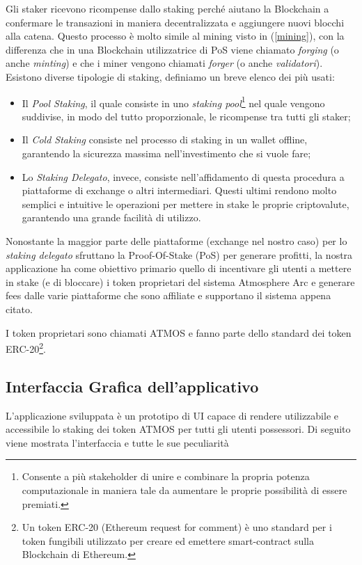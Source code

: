 Gli staker ricevono ricompense dallo staking perché aiutano la Blockchain a confermare le transazioni in maniera decentralizzata e aggiungere nuovi blocchi alla catena. Questo processo è molto simile al mining visto in (\ref{mining}), con la differenza che in una Blockchain utilizzatrice di PoS viene chiamato \textit{forging} (o anche \textit{minting}) e che i miner vengono chiamati \textit{forger} (o anche \textit{validatori}). Esistono diverse tipologie di staking, definiamo un breve elenco dei più usati:

\begin{itemize}
\item Il \textit{Pool Staking}, il quale consiste in uno \textit{staking pool}\footnote{Consente a più stakeholder di unire e combinare la propria potenza computazionale in maniera tale da aumentare le proprie possibilità di essere premiati.} nel quale vengono suddivise, in modo del tutto proporzionale, le ricompense tra tutti gli staker;
\item Il \textit{Cold Staking} consiste nel processo di staking in un wallet offline, garantendo la sicurezza massima nell'investimento che si vuole fare;
\item Lo \textit{Staking Delegato}, invece, consiste nell'affidamento di questa procedura a piattaforme di exchange o altri intermediari. Questi ultimi rendono molto semplici e intuitive le operazioni per mettere in stake le proprie criptovalute, garantendo una grande facilità di utilizzo.
\end{itemize}

Nonostante la maggior parte delle piattaforme (exchange nel nostro caso) per lo \textit{staking delegato} sfruttano la Proof-Of-Stake (PoS) per generare profitti, la nostra applicazione ha come obiettivo primario quello di incentivare gli utenti a mettere in stake (e di bloccare) i token proprietari del sistema Atmosphere Arc \cite{atmt} e generare fees dalle varie piattaforme che sono affiliate e supportano il sistema appena citato.

I token proprietari sono chiamati ATMOS e fanno parte dello standard dei token ERC-20\footnote{Un token ERC-20 (Ethereum request for comment) è uno standard per i token fungibili utilizzato per creare ed emettere smart-contract sulla Blockchain di Ethereum.}. 
\subsection{Interfaccia Grafica dell'applicativo}\label{UI_staking}
L'applicazione sviluppata è un prototipo di UI capace di rendere utilizzabile e accessibile lo staking dei token ATMOS per tutti gli utenti possessori. Di seguito viene mostrata l'interfaccia e tutte le sue peculiarità

